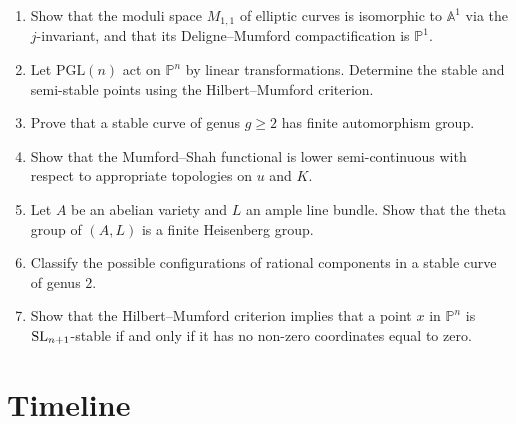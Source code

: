 \begin{enumerate}
    \item [I] Show that the moduli space $M_{1,1}$ of elliptic curves is isomorphic to $\mathbb{A}^1$ via the $j$-invariant, and that its Deligne--Mumford compactification is $\mathbb{P}^1$.
    \item [I] Let $\mathrm{PGL}(n)$ act on $\mathbb{P}^n$ by linear transformations. Determine the stable and semi-stable points using the Hilbert--Mumford criterion.
    \item [I] Prove that a stable curve of genus $g \geq 2$ has finite automorphism group.
    \item [I] Show that the Mumford--Shah functional is lower semi-continuous with respect to appropriate topologies on $u$ and $K$.
    \item [I] Let $A$ be an abelian variety and $L$ an ample line bundle. Show that the theta group of $(A, L)$ is a finite Heisenberg group.
    \item [I] Classify the possible configurations of rational components in a stable curve of genus $2$.
    \item [B] Show that the Hilbert--Mumford criterion implies that a point $x$ in $\mathbb{P}^n$ is $\operatorname{SL}_{n+1}$-stable if and only if it has no non-zero coordinates equal to zero.
\end{enumerate}

\section*{Timeline}

